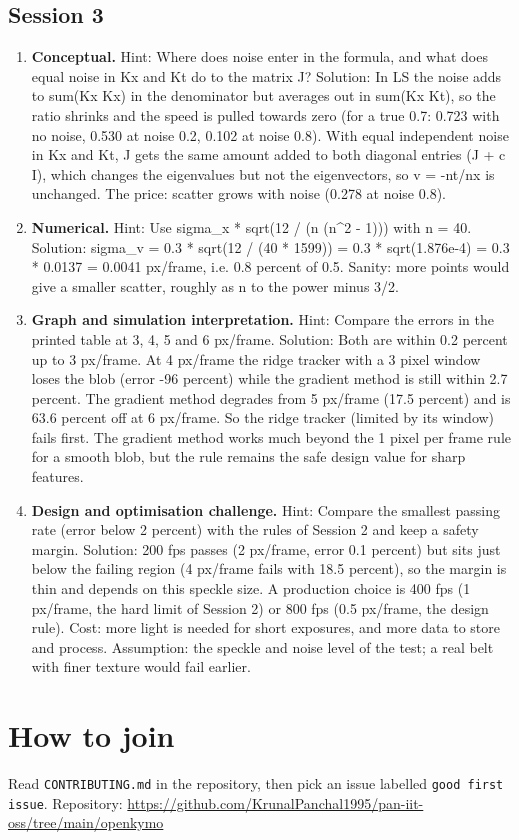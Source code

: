 \documentclass[11pt,a4paper]{article}
\begin{document}
\subsection*{Session 3}
\begin{enumerate}[nosep]
\item \textbf{Conceptual.} Hint: Where does noise enter in the formula, and what does equal noise in Kx and Kt do to the matrix J? Solution: In LS the noise adds to sum(Kx Kx) in the denominator but averages out in sum(Kx Kt), so the ratio shrinks and the speed is pulled towards zero (for a true 0.7: 0.723 with no noise, 0.530 at noise 0.2, 0.102 at noise 0.8). With equal independent noise in Kx and Kt, J gets the same amount added to both diagonal entries (J + c I), which changes the eigenvalues but not the eigenvectors, so v = -nt/nx is unchanged. The price: scatter grows with noise (0.278 at noise 0.8).
\item \textbf{Numerical.} Hint: Use sigma\_x * sqrt(12 / (n (n\textasciicircum{}2 - 1))) with n = 40. Solution: sigma\_v = 0.3 * sqrt(12 / (40 * 1599)) = 0.3 * sqrt(1.876e-4) = 0.3 * 0.0137 = 0.0041 px/frame, i.e. 0.8 percent of 0.5. Sanity: more points would give a smaller scatter, roughly as n to the power minus 3/2.
\item \textbf{Graph and simulation interpretation.} Hint: Compare the errors in the printed table at 3, 4, 5 and 6 px/frame. Solution: Both are within 0.2 percent up to 3 px/frame. At 4 px/frame the ridge tracker with a 3 pixel window loses the blob (error -96 percent) while the gradient method is still within 2.7 percent. The gradient method degrades from 5 px/frame (17.5 percent) and is 63.6 percent off at 6 px/frame. So the ridge tracker (limited by its window) fails first. The gradient method works much beyond the 1 pixel per frame rule for a smooth blob, but the rule remains the safe design value for sharp features.
\item \textbf{Design and optimisation challenge.} Hint: Compare the smallest passing rate (error below 2 percent) with the rules of Session 2 and keep a safety margin. Solution: 200 fps passes (2 px/frame, error 0.1 percent) but sits just below the failing region (4 px/frame fails with 18.5 percent), so the margin is thin and depends on this speckle size. A production choice is 400 fps (1 px/frame, the hard limit of Session 2) or 800 fps (0.5 px/frame, the design rule). Cost: more light is needed for short exposures, and more data to store and process. Assumption: the speckle and noise level of the test; a real belt with finer texture would fail earlier.
\end{enumerate}

\section{How to join}
Read \texttt{CONTRIBUTING.md} in the repository, then pick an issue labelled \texttt{good first issue}. Repository: \url{https://github.com/KrunalPanchal1995/pan-iit-oss/tree/main/openkymo}
\end{document}
